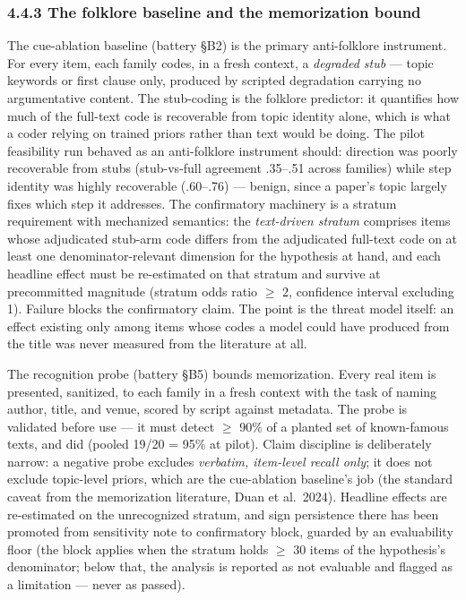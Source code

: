 \subsubsection{4.4.3 The folklore baseline and the memorization bound}\label{the-folklore-baseline-and-the-memorization-bound}

The cue-ablation baseline (battery \S{}B2) is the primary anti-folklore instrument. For every item, each family codes, in a fresh context, a \emph{degraded stub} --- topic keywords or first clause only, produced by scripted degradation carrying no argumentative content. The stub-coding is the folklore predictor: it quantifies how much of the full-text code is recoverable from topic identity alone, which is what a coder relying on trained priors rather than text would be doing. The pilot feasibility run behaved as an anti-folklore instrument should: direction was poorly recoverable from stubs (stub-vs-full agreement .35--.51 across families) while step identity was highly recoverable (.60--.76) --- benign, since a paper's topic largely fixes which step it addresses. The confirmatory machinery is a stratum requirement with mechanized semantics: the \emph{text-driven stratum} comprises items whose adjudicated stub-arm code differs from the adjudicated full-text code on at least one denominator-relevant dimension for the hypothesis at hand, and each headline effect must be re-estimated on that stratum and survive at precommitted magnitude (stratum odds ratio $\ge$ 2, confidence interval excluding 1). Failure blocks the confirmatory claim. The point is the threat model itself: an effect existing only among items whose codes a model could have produced from the title was never measured from the literature at all.

The recognition probe (battery \S{}B5) bounds memorization. Every real item is presented, sanitized, to each family in a fresh context with the task of naming author, title, and venue, scored by script against metadata. The probe is validated before use --- it must detect $\ge$ 90\% of a planted set of known-famous texts, and did (pooled 19/20 = 95\% at pilot). Claim discipline is deliberately narrow: a negative probe excludes \emph{verbatim, item-level recall only}; it does not exclude topic-level priors, which are the cue-ablation baseline's job (the standard caveat from the memorization literature, Duan et al.~2024). Headline effects are re-estimated on the unrecognized stratum, and sign persistence there has been promoted from sensitivity note to confirmatory block, guarded by an evaluability floor (the block applies when the stratum holds $\ge$ 30 items of the hypothesis's denominator; below that, the analysis is reported as not evaluable and flagged as a limitation --- never as passed).

